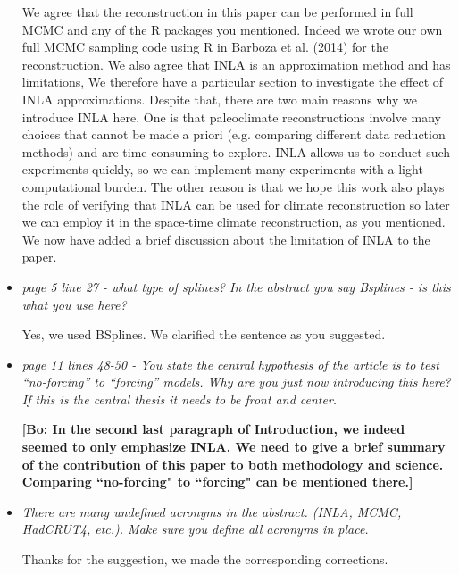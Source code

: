 \documentclass[11pt]{article}
\newcommand{\bl}[1]{\color{red}\textbf{[Bo: #1]}\normalcolor}
\begin{document}
\begin{itemize}
We agree that the reconstruction in this paper can be performed in full MCMC and any of the R packages you mentioned. Indeed we wrote our own full MCMC sampling code using R in Barboza et al. (2014) for the reconstruction. We also agree that INLA is an approximation method and has limitations, We therefore have a particular section to investigate the effect of INLA approximations. Despite that,  there are two main reasons why we introduce INLA here. One is that paleoclimate reconstructions involve many choices that cannot be made a priori (e.g. comparing different data reduction methods) and are time-consuming to explore. INLA allows us to conduct such experiments quickly, so we can implement many experiments with a light computational burden. The other reason is that we hope this work also plays the role of verifying that INLA can be used for climate reconstruction so later we can employ it in the space-time climate reconstruction, as you mentioned. We now have added a brief discussion about the limitation of INLA to the paper.


\item \textit{page 5 line 27 - what type of splines? In the abstract you say Bsplines - is this what you use here?}

Yes, we used BSplines. We clarified the sentence as you suggested.

\item \textit{page 11 lines 48-50 - You state the central hypothesis of the
    article is to test “no-forcing” to “forcing” models. Why are you just now
    introducing this here? If this is the central thesis it needs to be front
    and center.}

 \bl{In the second last paragraph of Introduction, we indeed seemed to only emphasize INLA. We need to give a brief summary of the contribution of this paper to both methodology and science. Comparing ``no-forcing" to ``forcing" can be mentioned there.}

\item \textit{There are many undefined acronyms in the abstract. (INLA, MCMC,
    HadCRUT4, etc.). Make sure you define all acronyms in place.}

Thanks for the suggestion, we made the corresponding corrections.
  
\end{itemize}
\end{document}
